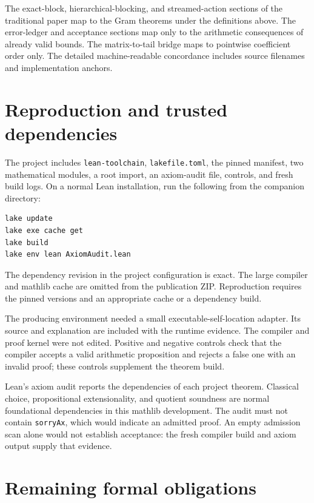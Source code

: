 \documentclass[11pt]{article}
\newcommand{\decl}[1]{\nolinkurl{#1}}
\begin{document}
The exact-block, hierarchical-blocking, and streamed-action sections of the
traditional paper map to the Gram theorems under the definitions above. The
error-ledger and acceptance sections map only to the arithmetic consequences
of already valid bounds. The matrix-to-tail bridge maps to pointwise
coefficient order only. The detailed machine-readable concordance includes
source filenames and implementation anchors.

\section{Reproduction and trusted dependencies}

The project includes \decl{lean-toolchain}, \decl{lakefile.toml}, the pinned
manifest, two mathematical modules, a root import, an axiom-audit file,
controls, and fresh build logs. On a normal Lean installation, run the
following from the companion directory:
\begin{verbatim}
lake update
lake exe cache get
lake build
lake env lean AxiomAudit.lean
\end{verbatim}
The dependency revision in the project configuration is exact. The large
compiler and mathlib cache are omitted from the publication ZIP. Reproduction
requires the pinned versions and an appropriate cache or a dependency build.

The producing environment needed a small executable-self-location adapter.
Its source and explanation are included with the runtime evidence. The
compiler and proof kernel were not edited. Positive and negative controls
check that the compiler accepts a valid arithmetic proposition and rejects a
false one with an invalid proof; these controls supplement the theorem build.

Lean's axiom audit reports the dependencies of each project theorem. Classical
choice, propositional extensionality, and quotient soundness are normal
foundational dependencies in this mathlib development. The audit must not
contain \decl{sorryAx}, which would indicate an admitted proof. An empty
admission scan alone would not establish acceptance: the fresh compiler build
and axiom output supply that evidence.

\begingroup
\small
\setlength{\parskip}{3pt}
\section{Remaining formal obligations}
\end{document}
